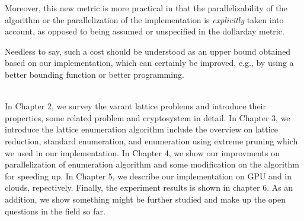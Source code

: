 \begin{CJK}{Bg5}{bsmi}
%
Moreover, this new metric is more practical in that the
parallelizability of the algorithm or the parallelization of the
implementation is \emph{explicitly} taken into account, as opposed to
being assumed or unspecified in the dollarday metric.

Needless to say, such a cost should be understood as an upper bound
obtained based on our implementation, which can certainly be improved, e.g.,
by using a better bounding function or better programming.

\textrm{\\}
In Chapter 2, we survey the varant lattice problems and introduce their properties, some related problem and cryptosystem in detail.
In Chapter 3, we introduce the lattice enumeration algorithm include the overview on lattice reduction, standard enumeration, and enumeration using extreme pruning which we used in our implementation.
In Chapter 4, we show our improvments on parallelization of enumeration algorithm and some modification on the algorithm for speeding up.
In Chapter 5, we describe our implementation on GPU and in clouds, repectively.
Finally, the experiment results is shown in chapter 6.
As an addition, we show something might be further studied and make up the open questions in the field so far.
\begin{comment}
\end{comment}

\end{CJK}

